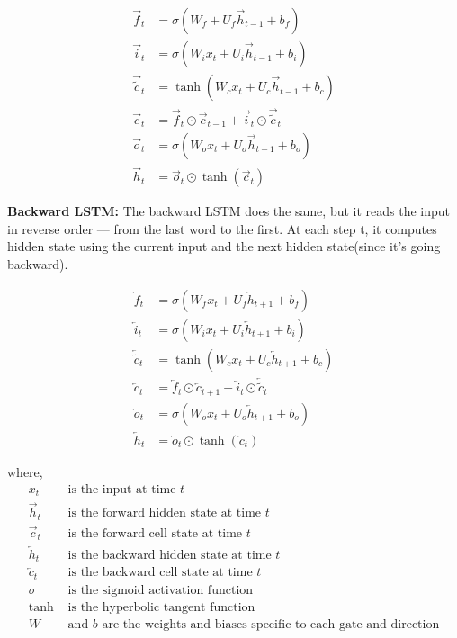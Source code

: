 \documentclass{article}
\begin{document}
\[
\begin{aligned}
\overrightarrow{f}_t &= \sigma(W_f  + U_f \overrightarrow{h}_{t-1} + b_f) \\
\overrightarrow{i}_t &= \sigma(W_i x_t + U_i \overrightarrow{h}_{t-1} + b_i) \\
\overrightarrow{\tilde{c}}_t &= \tanh(W_c x_t + U_c \overrightarrow{h}_{t-1} + b_c) \\
\overrightarrow{c}_t &= \overrightarrow{f}_t \odot \overrightarrow{c}_{t-1} + \overrightarrow{i}_t \odot \overrightarrow{\tilde{c}}_t \\
\overrightarrow{o}_t &= \sigma(W_o x_t + U_o \overrightarrow{h}_{t-1} + b_o) \\
\overrightarrow{h}_t &= \overrightarrow{o}_t \odot \tanh(\overrightarrow{c}_t)
\end{aligned}
\]

\textbf{Backward LSTM:} The backward LSTM does the same, but it reads the input in reverse order — from the last word to the first. At each step t, it computes hidden state using the current input and the next hidden state(since it's going backward).

\[
\begin{aligned}
\overleftarrow{f}_t &= \sigma(W_f x_t + U_f \overleftarrow{h}_{t+1} + b_f) \\
\overleftarrow{i}_t &= \sigma(W_i x_t + U_i \overleftarrow{h}_{t+1} + b_i) \\
\overleftarrow{\tilde{c}}_t &= \tanh(W_c x_t + U_c \overleftarrow{h}_{t+1} + b_c) \\
\overleftarrow{c}_t &= \overleftarrow{f}_t \odot \overleftarrow{c}_{t+1} + \overleftarrow{i}_t \odot \overleftarrow{\tilde{c}}_t \\
\overleftarrow{o}_t &= \sigma(W_o x_t + U_o \overleftarrow{h}_{t+1} + b_o) \\
\overleftarrow{h}_t &= \overleftarrow{o}_t \odot \tanh(\overleftarrow{c}_t)
\end{aligned}
\]

where,
\[
\begin{aligned}
x_t &\text{ is the input at time } t \\
\overrightarrow{h}_{t} &\text{ is the forward hidden state at time } t \\
\overrightarrow{c}_{t} &\text{ is the forward cell state at time } t \\
\overleftarrow{h}_{t} &\text{ is the backward hidden state at time } t \\
\overleftarrow{c}_{t} &\text{ is the backward cell state at time } t \\
\sigma &\text{ is the sigmoid activation function} \\
\tanh &\text{ is the hyperbolic tangent function} \\
W &\text{ and } b \text{ are the weights and biases specific to each gate and direction}
\end{aligned}
\]
\end{document}

